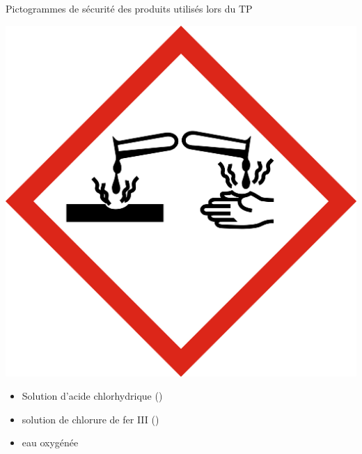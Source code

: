 \begin{doc}{Pictogrammes de sécurité des produits utilisés lors du TP}
    \begin{minipage}{0.5\linewidth}
        
        \begin{center}
            \includegraphics[scale=0.3]{Images/Fiche_Methode1/SGH05_Corrosion.jpg}
        \end{center}
        \begin{itemize}
            \item Solution d'acide chlorhydrique ()
            \item solution de chlorure de fer III ()
            \item eau oxygénée 
        \end{itemize}
        

\end{minipage}
\end{doc}
